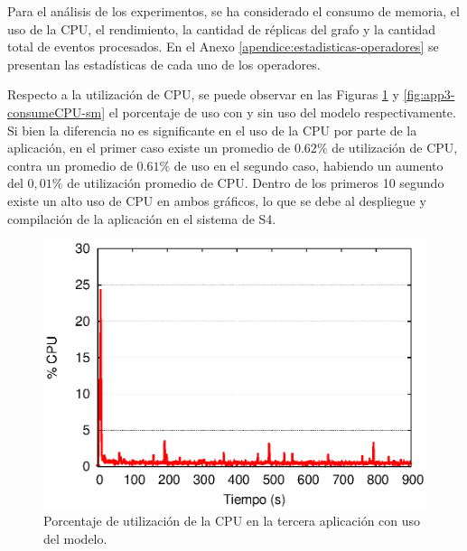 Para el análisis de los experimentos, se ha considerado el consumo de memoria, el uso de la CPU, \normalsize{el rendimiento, la cantidad de réplicas del grafo} y la cantidad total de eventos procesados. En el Anexo \ref{apendice:estadisticas-operadores} \normalsize{se presentan las estadísticas de cada uno de los operadores.}


Respecto a la utilización de CPU, se puede observar en las Figuras \ref{fig:app3-consumeCPU-cm} y \ref{fig:app3-consumeCPU-sm} el porcentaje de uso con y sin uso del modelo respectivamente. Si bien la diferencia no es significante en el uso de la CPU por parte de la aplicación, en el primer caso existe un promedio de $0.62\%$ de utilización de CPU, contra un promedio de $0.61\%$ de uso en el segundo caso, habiendo un aumento del $0,01\%$ de utilización promedio de CPU. Dentro de los primeros 10 segundo existe un alto uso de CPU en ambos gráficos, lo que se debe al despliegue y compilación de la aplicación en el sistema de S4.

\begin{figure}[!ht]
\centering
    \includegraphics[scale=0.75]{images/exp/app3/cm/fisical/consumeCPU.eps}
    \caption{Porcentaje de utilización de la CPU en la tercera aplicación con uso del modelo.}
    \label{fig:app3-consumeCPU-cm}
\end{figure}

